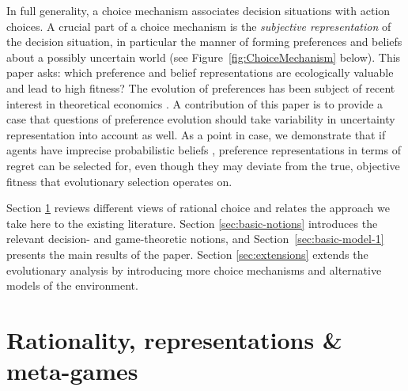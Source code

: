 \documentclass[fleqn,reqno,11pt]{article}
\begin{document}
In full generality, a choice mechanism associates decision situations with action choices. A crucial
part of a choice mechanism is the \emph{subjective representation} of the decision situation,
in particular the manner of forming preferences and beliefs about a possibly uncertain world (see
Figure~\ref{fig:ChoiceMechanism} below). This paper asks: which preference and belief
representations are ecologically valuable and lead to high fitness?
The evolution of
preferences has been subject of recent interest in theoretical economics
\citep[e.g.,][]{algweib13,DekElyYlan07,RobSam11}. A contribution of this paper is
to provide a case that questions of preference evolution should take
variability in uncertainty representation into account as well. As a point in case, we demonstrate
that if agents have imprecise probabilistic beliefs \citep[e.g.][]{gardsah82,levi74,walley96},
preference representations in terms of regret can be selected for, even though they may deviate
from the true, objective fitness that evolutionary selection operates on.


Section \ref{sec:rati--subj} reviews different views of rational choice and relates the
approach we take here to the existing literature. Section \ref{sec:basic-notions} introduces the
relevant decision- and game-theoretic notions, and
Section~\ref{sec:basic-model-1} presents the
main results of the paper. Section \ref{sec:extensions} extends the evolutionary analysis by
introducing more choice mechanisms and alternative models of the environment.


\section{Rationality, representations \& meta-games}
\label{sec:rati--subj}
\end{document}
